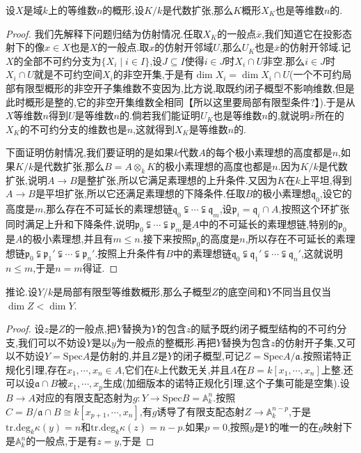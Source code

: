 \item 设$X$是域$k$上的等维数$n$的概形,设$K/k$是代数扩张,那么$K$概形$X_K$也是等维数$n$的.
\begin{proof}
	
	我们先解释下问题归结为仿射情况.任取$X_K$的一般点$\overline{x}$,我们知道它在投影态射下的像$x\in X$也是$X$的一般点.取$x$的仿射开邻域$U$,那么$U_K$也是$\overline{x}$的仿射开邻域.记$X$的全部不可约分支为$\{X_i\mid i\in I\}$,设$J\subseteq I$使得$i\in J$时$X_i\cap U$非空.那么$i\in J$时$X_i\cap U$就是不可约空间$X_i$的非空开集,于是有$\dim X_i=\dim X_i\cap U$(一个不可约局部有限型概形的非空开子集维数不变因为,比方说,取既约闭子概型不影响维数,但是此时概形是整的,它的非空开集维数全相同【所以这里要局部有限型条件?】).于是从$X$等维数$n$得到$U$是等维数$n$的.倘若我们能证明$U_K$也是等维数$n$的,就说明$\overline{x}$所在的$X_K$的不可约分支的维数也是$n$,这就得到$X_K$是等维数$n$的.
	
	\qquad
	
	下面证明仿射情况,我们要证明的是如果$k$代数$A$的每个极小素理想的高度都是$n$,如果$K/k$是代数扩张,那么$B=A\otimes_kK$的极小素理想的高度也都是$n$.因为$K/k$是代数扩张,说明$A\to B$是整扩张,所以它满足素理想的上升条件.又因为$K$在$k$上平坦,得到$A\to B$是平坦扩张,所以它还满足素理想的下降条件.任取$B$的极小素理想$\mathfrak{q}_0$,设它的高度是$m$,那么存在不可延长的素理想链$\mathfrak{q}_0\subsetneqq\cdots\subsetneqq\mathfrak{q}_m$,设$\mathfrak{p}_i=\mathfrak{q}_i\cap A$,按照这个环扩张同时满足上升和下降条件,说明$\mathfrak{p}_0\subsetneqq\cdots\subsetneqq\mathfrak{p}_m$是$A$中的不可延长的素理想链,特别的$\mathfrak{p}_0$是$A$的极小素理想,并且有$m\le n$.接下来按照$\mathfrak{p}_0$的高度是$n$,所以存在不可延长的素理想链$\mathfrak{p}_0\subsetneqq\mathfrak{p}_1'\subsetneqq\cdots\subsetneqq\mathfrak{p}_n'$.按照上升条件有$B$中的素理想链$\mathfrak{q}_0\subsetneqq\mathfrak{q}_1'\subsetneqq\cdots\subsetneqq\mathfrak{q}_n'$,这就说明$n\le m$,于是$n=m$得证.
\end{proof}

推论.设$Y/k$是局部有限型等维数概形,那么子概型$Z$的底空间和$Y$不同当且仅当$\dim Z<\dim Y$.
\begin{proof}
	
	设$z$是$Z$的一般点,把$Y$替换为$Y$的包含$z$的赋予既约闭子概型结构的不可约分支,我们可以不妨设$Y$是以$y$为一般点的整概形.再把$Y$替换为包含$z$的仿射开子集,又可以不妨设$Y=\mathrm{Spec}A$是仿射的,并且$Z$是$Y$的闭子概型,可记$Z=\mathrm{Spec}A/\mathfrak{a}$.按照诺特正规化引理,存在$x_1,\cdots,x_n\in A$,它们在$k$上代数无关,并且$A$在$B=k[x_1,\cdots,x_n]$上整.还可以设$\mathfrak{a}\cap B$被$x_1,\cdots,x_p$生成(加细版本的诺特正规化引理,这个子集可能是空集).设$B\to A$对应的有限支配态射为$g:Y\to\mathrm{Spec}B=\mathbb{A}_k^n$.按照$C=B/\mathfrak{a}\cap B\cong k[x_{p+1},\cdots,x_n]$,有$g$诱导了有限支配态射$Z\to\mathbb{A}_k^{n-p}$,于是$\mathrm{tr.deg}_k\kappa(y)=n$和$\mathrm{tr.deg}_k\kappa(z)=n-p$.如果$p=0$,按照$y$是$Y$的唯一的在$g$映射下是$\mathbb{A}_k^n$的一般点,于是有$z=y$,于是$$
	
\end{proof}

